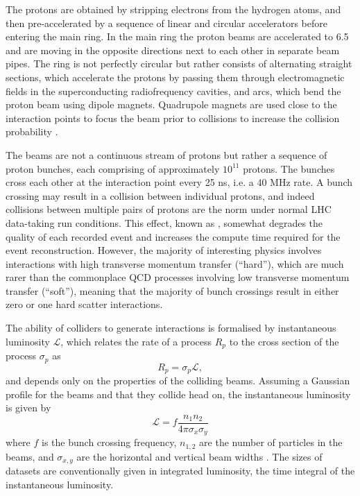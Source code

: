 The protons are obtained by stripping electrons from the hydrogen atoms,
and then pre-accelerated by a sequence of linear and circular accelerators
before entering the main ring. In the main ring the proton beams are
accelerated to 6.5 \TeV and are moving in the opposite directions next to each other
in separate beam pipes. The ring is not perfectly circular but rather consists
of alternating straight sections, which accelerate the protons by passing
them through electromagnetic fields in the superconducting radiofrequency
cavities, and arcs, which bend the proton beam using dipole magnets.
Quadrupole magnets are used close to the interaction points to focus the
beam prior to collisions to increase the collision probability \cite{Brüning:782076}. 

The beams are not a continuous stream of protons but rather a sequence of
proton bunches, each comprising of approximately $10^{11}$ protons. The
bunches cross each other at the interaction point every 25 ns, i.e. a
40 MHz rate. A bunch crossing may result in a collision between
individual protons, and indeed collisions between multiple pairs of
protons are the norm under normal LHC data-taking run conditions.
This effect, known as \pileup, somewhat degrades the quality of
each recorded event and increases the compute time required for the
event reconstruction. However, the majority of interesting physics
involves interactions with high transverse momentum transfer (``hard''),
which are much rarer than the commonplace QCD processes involving
low transverse momentum transfer (``soft''), meaning that the majority
of bunch crossings result in either zero or one hard scatter interactions.

The ability of colliders to generate interactions is formalised by
instantaneous luminosity $\mathcal{L}$, which relates the rate of a process $R_p$
to the cross section of the process $\sigma_p$ as
\begin{equation}
R_p = \sigma_p \mathcal{L},
\end{equation}
and depends only on the properties of the colliding beams. Assuming a
Gaussian profile for the beams and that they collide head on, the
instantaneous luminosity is given by
\begin{equation}
\mathcal{L} = f \frac{n_1 n_2 }{4 \pi \sigma_x \sigma_y}
\end{equation}
where $f$ is the bunch crossing frequency, $n_{1, 2}$ are the number of
particles in the beams, and $\sigma_{x,y}$ are the horizontal and vertical
beam widths \cite{Thomson:2013zua}. The sizes of datasets are conventionally
given in integrated luminosity, the time integral of the instantaneous
luminosity.


